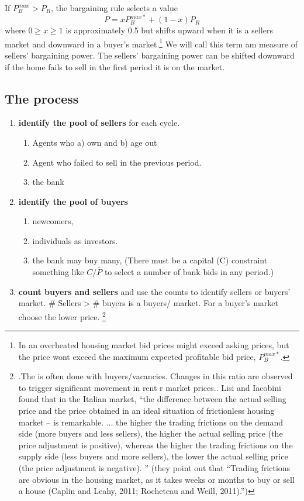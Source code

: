 {{If $P_B^{max}>P_R$,  the bargaining rule selects a value 
\[P = xP_B^{max*}+(1-x)P_R\]
where $0\ge x\ge 1$ is approximately 0.5 but shifts upward when it is a sellers market and downward in a buyer's market.\footnote{In an overheated housing market bid prices might exceed asking prices, but the price wont exceed the maximum expected profitable bid price, $P_B^{max*}$.} We will call this term am measure of \gls{sellers' bargaining power}.  The sellers' bargaining power can be shifted downward if the home fails to sell in the first period it is on the market. 

\subsection{The process}
\begin{enumerate}
\item \textbf{identify the pool of sellers} for each cycle.
    \begin{enumerate}
        \item Agents who a) own and b) age out
        \item Agent  who failed to sell in the previous period.
        \item the bank
    \end{enumerate}
\item \textbf{identify the pool of buyers} 
    \begin{enumerate}
         \item newcomers, 
         \item individuals as investors.
         \item the bank may buy many, (There must be a capital (C) constraint something like $C/\bar P$ to select a number of bank bids in any period.)
    \end{enumerate}

\item \textbf{count buyers and sellers} and use the counts to identify sellers or buyers' market. \# Sellers > \# buyers is a buyers/ market. For a buyer's market  choose the lower price. \footnote{.The is often done with buyers/vacancies. Changes in this ratio are observed to trigger significant movement in rent r market prices.\cite{wheatonVacancySearchPrices1990}. Lisi and Iacobini \cite{lisiEstimatingHousingPrice2015} found  that in the Italian market, ``the difference between the actual selling price and the price obtained in an ideal situation of frictionless housing market – is remarkable. ... the higher the trading frictions on the demand side (more buyers and less sellers), the higher the actual selling price (the price adjustment is positive), whereas the higher the trading frictions on the supply side (less buyers and more sellers), the lower the actual selling price (the price adjustment is negative). '' (they point out that ``Trading frictions are obvious in the housing market, as it takes weeks or months to buy or sell a house (Caplin and Leahy, 2011; Rocheteau and Weill, 2011).'')}  


\end{enumerate}}}

